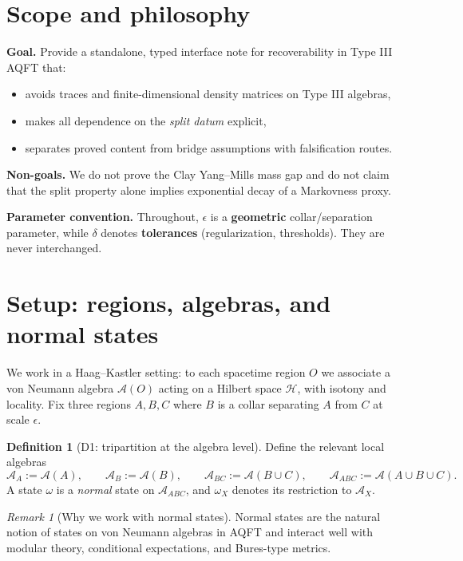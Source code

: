 \documentclass[11pt]{article}
\theoremstyle{definition}
\newtheorem{definition}[theorem]{Definition}
\theoremstyle{remark}
\newtheorem{remark}[theorem]{Remark}
\newcommand{\cA}{\mathcal{A}}
\begin{document}
\section{Scope and philosophy}

\textbf{Goal.} Provide a standalone, typed interface note for
recoverability in Type III AQFT that:
\begin{itemize}
\item avoids traces and finite-dimensional density matrices on Type III
algebras,
\item makes all dependence on the \emph{split datum} explicit,
\item separates proved content from bridge assumptions with
falsification routes.
\end{itemize}

\textbf{Non-goals.} We do not prove the Clay Yang--Mills mass gap and do
not claim that the split property alone implies exponential decay of a
Markovness proxy.

\textbf{Parameter convention.} Throughout, $\epsilon$ is a
\textbf{geometric} collar/separation parameter, while $\delta$ denotes
\textbf{tolerances} (regularization, thresholds). They are never
interchanged.

\section{Setup: regions, algebras, and normal states}

We work in a Haag--Kastler setting: to each spacetime region $O$ we
associate a von Neumann algebra $\cA(O)$ acting on a Hilbert space
$\mathcal{H}$, with isotony and locality. Fix three regions $A, B, C$
where $B$ is a collar separating $A$ from $C$ at scale $\epsilon$.

\begin{definition}[D1: tripartition at the algebra level]
\label{def:tripart}
Define the relevant local algebras
\[
\cA_A := \cA(A), \qquad \cA_B := \cA(B), \qquad \cA_{BC} := \cA(B \cup
C), \qquad \cA_{ABC} := \cA(A \cup B \cup C).
\]
A state $\omega$ is a \emph{normal} state on $\cA_{ABC}$, and $\omega_X$
denotes its restriction to $\cA_X$.
\end{definition}

\begin{remark}[Why we work with normal states]
\label{rem:normal}
Normal states are the natural notion of states on von Neumann algebras
in AQFT and interact well with modular theory, conditional expectations,
and Bures-type metrics.
\end{remark}
\end{document}
